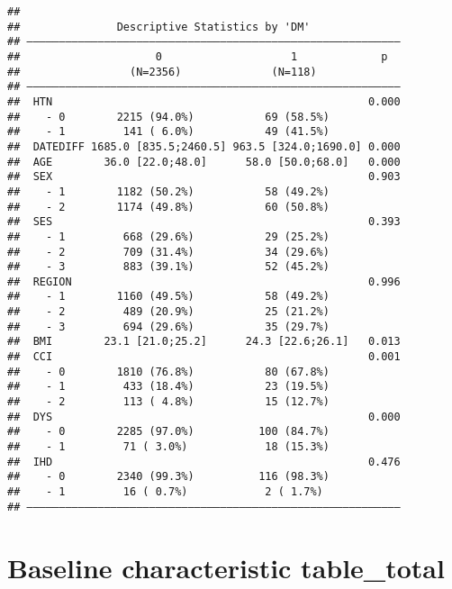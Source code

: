 \documentclass[
]{book}
\theoremstyle{definition}
\theoremstyle{definition}
\theoremstyle{definition}
\theoremstyle{definition}
\theoremstyle{remark}
\begin{document}
\begin{verbatim}
## 
##               Descriptive Statistics by 'DM'             
## —————————————————————————————————————————————————————————— 
##                     0                    1             p  
##                 (N=2356)              (N=118)       
## —————————————————————————————————————————————————————————— 
##  HTN                                                 0.000
##    - 0        2215 (94.0%)           69 (58.5%)           
##    - 1         141 ( 6.0%)           49 (41.5%)           
##  DATEDIFF 1685.0 [835.5;2460.5] 963.5 [324.0;1690.0] 0.000
##  AGE        36.0 [22.0;48.0]      58.0 [50.0;68.0]   0.000
##  SEX                                                 0.903
##    - 1        1182 (50.2%)           58 (49.2%)           
##    - 2        1174 (49.8%)           60 (50.8%)           
##  SES                                                 0.393
##    - 1         668 (29.6%)           29 (25.2%)           
##    - 2         709 (31.4%)           34 (29.6%)           
##    - 3         883 (39.1%)           52 (45.2%)           
##  REGION                                              0.996
##    - 1        1160 (49.5%)           58 (49.2%)           
##    - 2         489 (20.9%)           25 (21.2%)           
##    - 3         694 (29.6%)           35 (29.7%)           
##  BMI        23.1 [21.0;25.2]      24.3 [22.6;26.1]   0.013
##  CCI                                                 0.001
##    - 0        1810 (76.8%)           80 (67.8%)           
##    - 1         433 (18.4%)           23 (19.5%)           
##    - 2         113 ( 4.8%)           15 (12.7%)           
##  DYS                                                 0.000
##    - 0        2285 (97.0%)          100 (84.7%)           
##    - 1         71 ( 3.0%)            18 (15.3%)           
##  IHD                                                 0.476
##    - 0        2340 (99.3%)          116 (98.3%)           
##    - 1         16 ( 0.7%)            2 ( 1.7%)            
## ——————————————————————————————————————————————————————————
\end{verbatim}

\hypertarget{baseline-characteristic-table_total}{%
\section{Baseline characteristic table\_total}\label{baseline-characteristic-table_total}}
\end{document}
